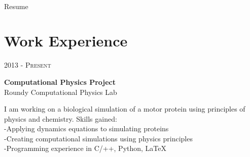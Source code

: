 \documentclass[10pt]{article} %
\begin{document}
\color{text1} %


\par{\\ %
{\color{headings} Resume\\[15pt]\par} %
	

\begin{minipage}[t]{0.5\textwidth} %
\vspace{0pt} %
	

\section{Work Experience} 


{\raggedleft\textsc{2013 - Present}\par}

{\raggedright\large \textbf{Computational Physics Project}\\
{Roundy Computational Physics Lab}\\[5pt]}
\normalsize{I am working on a biological simulation of a motor protein using principles of physics and chemistry. Skills gained:}\\
\hspace*{0.2in}-Applying dynamics equations to simulating proteins\\
\hspace*{0.2in}-Creating computational simulations using physics principles\\
\hspace*{0.2in}-Programming experience in C/++, Python, LaTeX\\


\end{minipage}}
\end{document}
